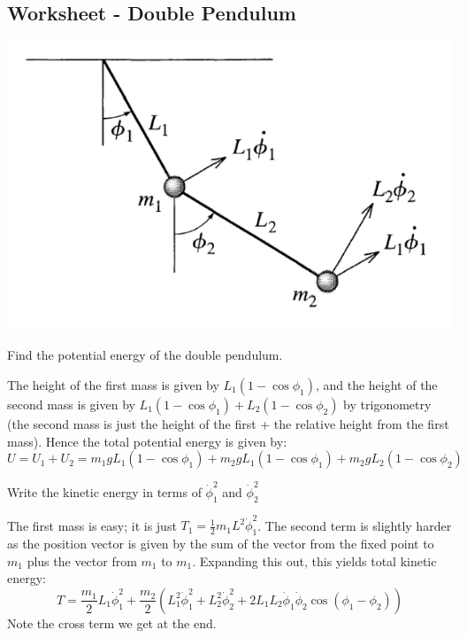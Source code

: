 \documentclass[../PHYS306Notes.tex]{subfiles}
\begin{document}
\subsection{Worksheet - Double Pendulum}
\begin{center}
    \includegraphics[scale=0.5]{Lecture-11/w11-img1.png}
\end{center}
\begin{p}
Find the potential energy of the double pendulum.
\end{p}
\begin{s}
The height of the first mass is given by $L_1(1-\cos\phi_1)$, and the height of the second mass is given by $L_1(1-\cos\phi_1) + L_2(1-\cos\phi_2)$ by trigonometry (the second mass is just the height of the first + the relative height from the first mass). Hence the total potential energy is given by:
\[U = U_1 + U_2 = m_1gL_1(1-\cos\phi_1) + m_2gL_1(1-\cos\phi_1) + m_2gL_2(1-\cos\phi_2)\]
\end{s}

\begin{p}
Write the kinetic energy in terms of $\dot{\phi}^2_1$ and $\dot{\phi}^2_2$
\end{p}
\begin{s}
The first mass is easy; it is just $T_1 = \frac{1}{2}m_1L^2\dot{\phi}_1^2$. The second term is slightly harder as the position vector is given by the sum of the vector from the fixed point to $m_1$ plus the vector from $m_1$ to $m_1$. Expanding this out, this yields total kinetic energy:
\[T = \frac{m_1}{2}L_1\dot{\phi}_1^2 + \frac{m_2}{2}\left(L_1^2\dot{\phi}_1^2 + L_2^2\dot{\phi}_2^2 + 2L_1L_2\dot{\phi}_1\dot{\phi}_2\cos(\phi_1 - \phi_2)\right)\]
Note the cross term we get at the end.
\end{s}
\end{document}
